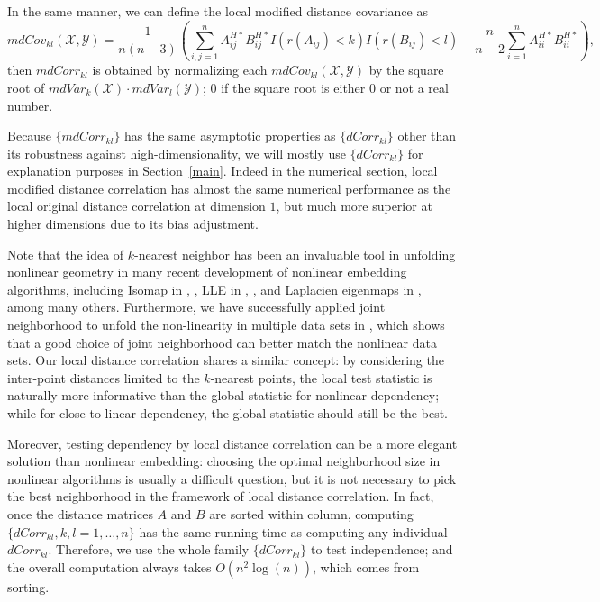 \documentclass[12pt]{article}
\begin{document}
In the same manner, we can define the local modified distance covariance as 
\begin{equation}
\label{localmdCovEqu}
mdCov_{kl}(\mathcal{X},\mathcal{Y})=\frac{1}{n(n-3)}(\sum_{i,j=1}^{n}A^{H*}_{ij}B^{H*}_{ij}I(r(A_{ij})<k)I(r(B_{ij})<l)-\frac{n}{n-2}\sum_{i=1}^{n}A^{H*}_{ii}B^{H*}_{ii}),
\end{equation}
then $mdCorr_{kl}$ is obtained by normalizing each $mdCov_{kl}(\mathcal{X},\mathcal{Y})$ by the square root of $mdVar_{k}(\mathcal{X}) \cdot mdVar_{l}(\mathcal{Y})$; $0$ if the square root is either $0$ or not a real number.

Because $\{mdCorr_{kl}\}$ has the same asymptotic properties as $\{dCorr_{kl}\}$ other than its robustness against high-dimensionality, we will mostly use $\{dCorr_{kl}\}$ for explanation purposes in Section~\ref{main}. Indeed in the numerical section, local modified distance correlation has almost the same numerical performance as the local original distance correlation at dimension $1$, but much more superior at higher dimensions due to its bias adjustment.

Note that the idea of $k$-nearest neighbor has been an invaluable tool in unfolding nonlinear geometry in many recent development of nonlinear embedding algorithms, including Isomap in \cite{TenenbaumSilvaLangford2000}, \cite{SilvaTenenbaum2003}, LLE in \cite{SaulRoweis2000}, \cite{RoweisSaul2003}, and Laplacien eigenmaps in \cite{BelkinNiyogi2003}, among many others. Furthermore, we have successfully applied joint neighborhood to unfold the non-linearity in multiple data sets in \cite{ShenVogelsteinPriebe2015}, which shows that a good choice of joint neighborhood can better match the nonlinear data sets. Our local distance correlation shares a similar concept: by considering the inter-point distances limited to the $k$-nearest points, the local test statistic is naturally more informative than the global statistic for nonlinear dependency; while for close to linear dependency, the global statistic should still be the best.

Moreover, testing dependency by local distance correlation can be a more elegant solution than nonlinear embedding: choosing the optimal neighborhood size in nonlinear algorithms is usually a difficult question, but it is not necessary to pick the best neighborhood in the framework of local distance correlation. In fact, once the distance matrices $A$ and $B$ are sorted within column, computing $\{dCorr_{kl}, k,l=1,\ldots,n\}$ has the same running time as computing any individual $dCorr_{kl}$. Therefore, we use the whole family $\{dCorr_{kl}\}$ to test independence; and the overall computation always takes $O(n^2 \log(n))$, which comes from sorting. 
\end{document}

